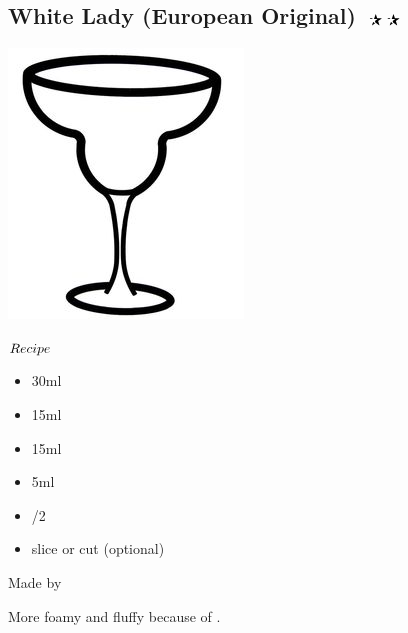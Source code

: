 \subsection{White Lady (European Original) $\openbigstar\openbigstar$}
\vspace{-7mm}
\hspace{90mm}
\includegraphics[scale=.05]{cocktail_glass_snow.jpg}
\vspace{2.5mm}
\begin{itembox}[l]{\boldmath $Recipe$}
\begin{itemize}
\setlength{\parskip}{0cm}
\setlength{\itemsep}{0cm}
\item \gin 30ml
\item \wc 15ml
\item \lj 15ml
\item \gumsyrup 5ml
\item {}/2
\item \lemon slice or cut (optional)
\end{itemize}
\vspace{-4mm}
Made by \shake
\end{itembox}
More foamy and fluffy because of \ew
\hspace{-1mm}.
